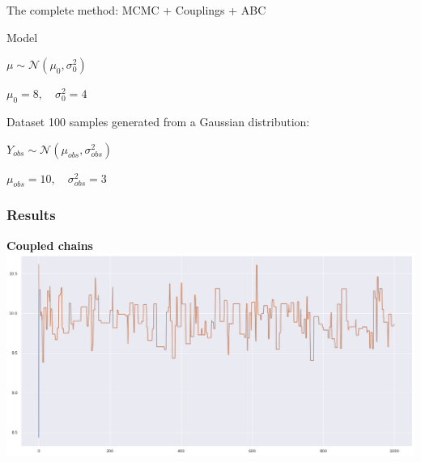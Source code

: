 \documentclass{beamer}
\begin{document}
\begin{section}{The complete method: MCMC + Couplings + ABC}
\begin{frame}
{\begin{block}{Model}
\begin{center}
					\vspace{0.3cm}
					
					$ \mu  \sim \mathcal{N}(\mu_0, \sigma_0^2)$
					
					$\mu_0 = 8, \quad \sigma^2_0 = 4$
				\end{center}
			\end{block}
			
			\begin{block}{Dataset}
				100 samples generated from a Gaussian distribution:
				\begin{center}
					$
					Y_{obs} \sim \mathcal{N}(\mu_{obs}, \sigma_{obs} ^2)
					$
					
					$
					\mu_{obs} = 10, \quad
					\sigma_{obs} ^2 = 3
					$
				\end{center}
			\end{block}
		}
	\end{frame}



	\begin{frame}
		\frametitle{Results}
		\begin{center}
			\begin{minipage}{0.63\textwidth}
				\begin{center}
					{\scriptsize \textbf{Coupled chains}}
					\includegraphics[width=\textwidth]{abc_coupling/2catabccoupling}
				\end{center}
			\end{minipage}
			
			\vspace{0.2cm}
			

\end{center}
\end{frame}
\end{section}
\end{document}
